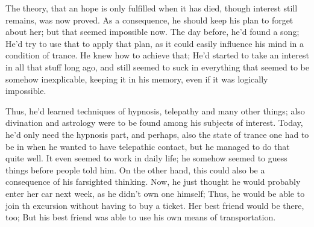The theory, that an hope is only fulfilled when it has died, though interest still remains, was now proved. 
As a consequence, he should keep his plan to forget about her; but that seemed impossible now. 
The day before, he'd found a song; He'd try to use that to apply that plan, as it could easily influence his mind in a condition of trance. 
He knew how to achieve that; He'd started to take an interest in all that stuff long ago, and still seemed to suck in everything that seemed to be somehow inexplicable, keeping it in his memory, even if it was logically impossible.

Thus, he'd learned techniques of hypnosis, telepathy and many other things; also divination and astrology were to be found among his subjects of interest. 
Today, he'd only need the hypnosis part, and perhaps, also the state of trance one had to be in when he wanted to have telepathic contact, but he managed to do that quite well. 
It even seemed to work in daily life; he somehow seemed to guess things before people told him. On the other hand, this could also be a consequence of his farsighted thinking. 
Now, he just thought he would probably enter her car next week, as he didn't own one himself; Thus, he would be able to join th excursion without having to buy a ticket. Her best friend would be there, too; But his best friend was able to use his own means of transportation.

